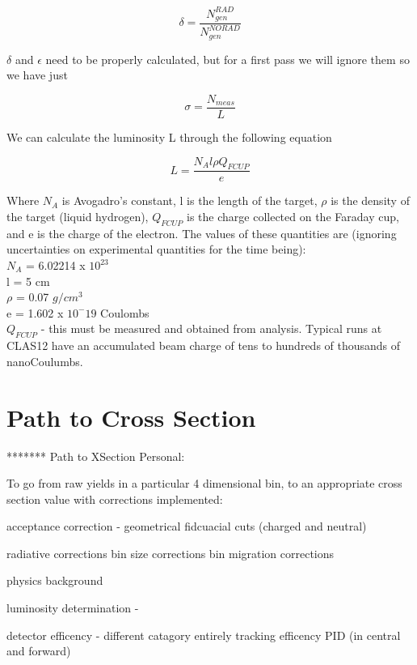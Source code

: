 \begin{equation}
    \delta = \frac{N^{RAD}_{gen}}{N^{NORAD}_{gen}}
\end{equation}

$\delta$ and $\epsilon$ need to be properly calculated, but for a first pass we will ignore them so we have just


\begin{equation}
    \sigma = \frac{N_{meas}}{L}
\end{equation}

We can calculate the luminosity L through the following equation

\begin{equation}
    L = \frac{N_A l \rho Q_{FCUP}}{e}
\end{equation}

Where $N_A$ is Avogadro's constant, l is the length of the target,  $\rho$ is the density of the target (liquid hydrogen), $Q_{FCUP}$ is the charge collected on the Faraday cup, and e is the charge of the electron. The values of these quantities are (ignoring uncertainties on experimental quantities for the time being):\\

$N_A$ = 6.02214 x $10^{23}$\\
l = 5 cm\\
$\rho$ = 0.07 $g/cm^3$\\
e = 1.602 x $10^-19$ Coulombs\\
$Q_{FCUP}$ - this must be measured and obtained from analysis. Typical runs at CLAS12 have an accumulated beam charge of tens to hundreds of thousands of nanoCoulumbs. 





\section{Path to Cross Section}
*******
Path to XSection Personal:

To go from raw yields in a particular 4 dimensional bin, to an appropriate cross section value with corrections implemented:


acceptance correction - geometrical
    fidcuacial cuts (charged and neutral)


radiative corrections
bin size corrections
bin migration corrections

physics background

luminosity determination -

detector efficency - different catagory entirely
tracking efficency 
PID (in central and forward)


